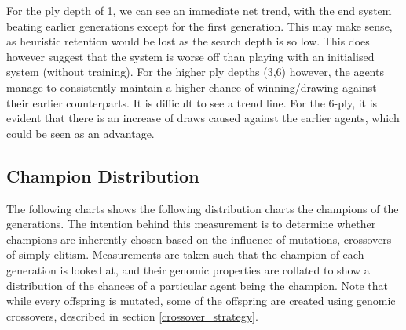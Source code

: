 \documentclass[12pt,a4paper]{article}
\begin{document}
    For the ply depth of 1, we can see an immediate net trend, with the end system beating earlier generations except for the first generation. This may make sense, as heuristic retention would be lost as the search depth is so low. This does however suggest that the system is worse off than playing with an initialised system (without training). For the higher ply depths (3,6) however, the agents manage to consistently maintain a higher chance of winning/drawing against their earlier counterparts. It is difficult to see a trend line. For the 6-ply, it is evident that there is an increase of draws caused against the earlier agents, which could be seen as an advantage.

    \subsection{Champion Distribution}
        The following charts shows the following distribution charts the champions of the generations. The intention behind this measurement is to determine whether champions are inherently chosen based on the influence of mutations, crossovers of simply elitism.  Measurements are taken such that the champion of each generation is looked at, and their genomic properties are collated to show a distribution of the chances of a particular agent being the champion. Note that while every offspring is mutated, some of the offspring are created using genomic crossovers, described in section \ref{crossover_strategy}. 
\end{document}
